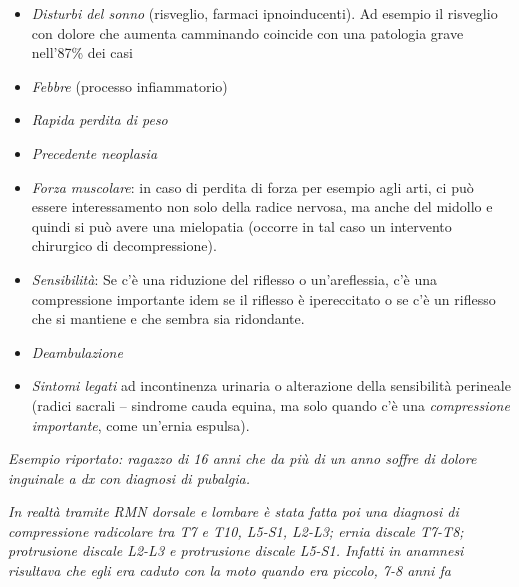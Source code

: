 \begin{itemize}
\item
   
  \emph{\emph{Disturbi del sonno}} (risveglio, farmaci ipnoinducenti).
  Ad esempio il risveglio con dolore che aumenta camminando coincide con
  una patologia grave nell'87\% dei casi

\item
   
  \emph{\emph{Febbre}} (processo infiammatorio)

\item
   
  \emph{\emph{Rapida perdita di peso}}

\item
   
  \emph{\emph{Precedente neoplasia}}
   

\item
   
  \emph{\emph{Forza muscolare}}: in caso di perdita di forza per esempio
  agli arti, ci può essere interessamento non solo della radice nervosa,
  ma anche del midollo e quindi si può avere una mielopatia (occorre in
  tal caso un intervento chirurgico di decompressione).

\item
   
  \emph{\emph{Sensibilità}}: Se c'è una riduzione del riflesso o
  un'areflessia, c'è una compressione importante idem se il riflesso è
  ipereccitato o se c'è un riflesso che si mantiene e che sembra sia
  ridondante.

\item
   
  \emph{\emph{Deambulazione}}

\item
   
  \emph{\emph{Sintomi legati}} ad incontinenza urinaria o alterazione
  della sensibilità perineale (radici sacrali -- sindrome cauda equina,
  ma solo quando c'è una \emph{\emph{compressione importante}}, come
  un'ernia espulsa).
   
\end{itemize}

\emph{Esempio riportato: ragazzo di 16 anni che da più di un anno soffre
di dolore inguinale a dx con diagnosi di pubalgia. }

\emph{In realtà tramite RMN dorsale e lombare è stata fatta poi una
diagnosi di compressione radicolare tra T7 e T10, L5-S1, L2-L3; ernia
discale T7-T8; protrusione discale L2-L3 e protrusione discale L5-S1.
Infatti in anamnesi risultava che egli era caduto con la moto quando era
piccolo, 7-8 anni fa}

